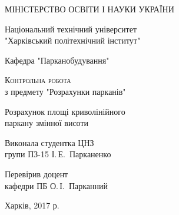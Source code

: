 \begin{titlepage}
  \begin{center}
    \large
    МІНІСТЕРСТВО ОСВІТИ І НАУКИ УКРАЇНИ
    
    \vspace{0.5cm}

    Національний технічний університет\\
    "Харківський політехнічний інститут"
    \vspace{0.25cm}
    
    Кафедра "Парканобудування"
    \vspace{2.5cm}
    \vfill
    
    \textsc{Контрольна робота}\\[2mm]
    
    з предмету "Розрахунки парканів"
    \vfill

    
    {\LARGE Розрахунок площі криволінійного\\
      паркану змінної висоти}
  \bigskip
    \vspace{6cm}
   
\end{center}
\vfill

\newlength{\ML}
\settowidth{\ML}{}
\hfill\begin{minipage}{0.5\textwidth}
  Виконала студентка ЦНЗ\\групи ПЗ-15 І.\,Е.~Парканенко
\end{minipage}%
\bigskip

\hfill\begin{minipage}{0.5\textwidth}
  Перевірив доцент\\кафедри ПБ О.\,І.~Парканний
\end{minipage}%
\vfill

\vspace{2cm}

\begin{center}
  Харків, 2017 р.
\end{center}

\end{titlepage}
